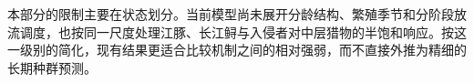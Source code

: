 本部分的限制主要在状态划分。当前模型尚未展开分龄结构、繁殖季节和分阶段放流调度，也按同一尺度处理江豚、长江鲟与入侵者对中层猎物的半饱和响应。按这一级别的简化，现有结果更适合比较机制之间的相对强弱，而不直接外推为精细的长期种群预测。
